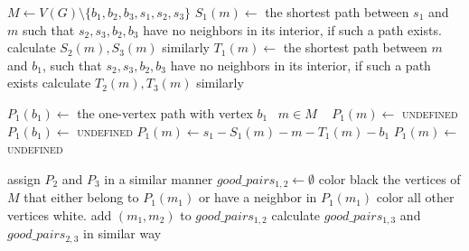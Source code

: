 \begin{algorithmic}[1]
	 \label{line:pyramidTriangle}
		 \label{line:pyramidTriple}
			\label{line:a}
				\ls $M \gets V(G) \setminus \{b_1, b_2, b_3, s_1, s_2, s_3\}$
				 \label{line:pyramidSStart}
					\ls $S_1(m) \gets$ the shortest path between $s_1$ and $m$ such that
					\lsx $s_2, s_3, b_2, b_3$ have no neighbors in its interior, if such a 
					\lsx path exists.
					\ls calculate $S_2(m), S_3(m)$ similarly
					\ls $T_1(m) \gets$ the shortest path between $m$ and $b_1$, such that
					\lsx $s_2, s_3, b_2, b_3$ have no neighbors in its interior, if such a
					\lsx path exists
					\ls calculate $T_2(m), T_3(m)$ similarly
				\mEndFor \label{line:pyramidSEnd}
				 
					 
						\ls $P_1(b_1) \gets$ the one-vertex path with vertex $b_1$
						\ls \algorithmicforeach ~$m \in M$ \algorithmicdo~ $P_1(m) \gets$ \textsc{undefined}
					\mElse
						\ls $P_1(b_1) \gets $ \textsc{undefined}
								\ls $P_1(m) \gets s_1-S_1(m)-m-T_1(m)-b_1$
							\mElse
								\ls $P_1(m) \gets$ \textsc{undefined}
							\mEndIf
						\mEndFor
					\mEndIf
				
				\ls assign $P_2$ and $P_3$ in a similar manner
				\ls $good\_pairs_{1,2} \gets \emptyset$ 
				 
						\ls color black the vertices of $M$ that either belong to \label{line:pyramidColor}
						\lsx $P_1(m_1)$ or have a neighbor in $P_1(m_1)$
						\lsx color all other vertices white.
							 \label{line:pyramidColor2}
								\ls add $(m_1, m_2)$ to $good\_pairs_{1,2}$
							\mEndIf
						\mEndFor
					\mEndIf
				\mEndFor
				\ls calculate $good\_pairs_{1,3}$ and $good\_pairs_{2,3}$ in similar way
				 \label{line:m1m2m3}
						\ls \RETURN \TRUE \label{line:pyramidTrue}
					\mEndIf
				\mEndFor
			\mEndIf \label{line:pyramidEnd}
		\mEndFor
	\mEndFor
	\ls \RETURN \FALSE
	\mEndProcedure
\end{algorithmic}

